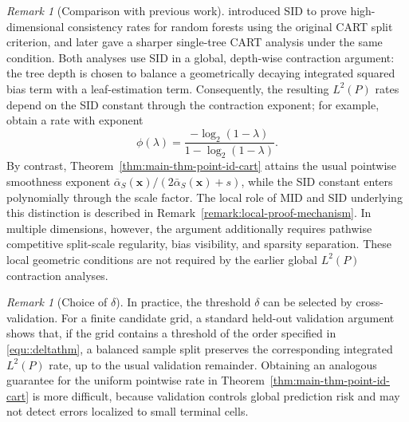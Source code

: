 \documentclass[11pt]{article}
\theoremstyle{plain}
\theoremstyle{definition}
\theoremstyle{remark}
\newtheorem{remark}[theorem]{Remark}
\theoremstyle{plain}
\newcommand{\bx}{\mathbf{x}}
\newcommand{\bX}{\mathbf{X}}
\DeclarePairedDelimiter{\sgnorm}{\|}{\|_{\psi_2}}
\newcommand{\1}{\mathbbm{1}}
\begin{document}
\begin{remark}[Comparison with previous work] \label{rem:comparison-with-previous-work}
\citet{chi2022asymptotic} introduced SID to prove high-dimensional consistency rates for random forests using the original CART split criterion, and \citet{Mazumder2024} later gave a sharper single-tree CART analysis under the same condition.
Both analyses use SID in a global, depth-wise contraction argument: the tree depth is chosen to balance a geometrically decaying integrated squared bias term with a leaf-estimation term.
Consequently, the resulting $L^2(P)$ rates depend on the SID constant through the contraction exponent; for example, \citet{Mazumder2024} obtain a rate with exponent
\[
\phi(\lambda)
=
\frac{-\log_2(1-\lambda)}{1-\log_2(1-\lambda)}.
\]
By contrast, Theorem~\ref{thm:main-thm-point-id-cart} attains the usual pointwise smoothness exponent $\bar\alpha_S(\bx)/(2\bar\alpha_S(\bx)+s)$, while the SID constant enters polynomially through the scale factor. The local role of MID and SID underlying this distinction is described in Remark~\ref{remark:local-proof-mechanism}. In multiple dimensions, however, the argument additionally requires pathwise competitive split-scale regularity, bias visibility, and sparsity separation. These local geometric conditions are not required by the earlier global $L^2(P)$ contraction analyses.
\end{remark}

\begin{remark}[Choice of $\delta$]
    In practice, the threshold $\delta$ can be selected by cross-validation. For a finite candidate grid, a standard held-out validation argument shows that, if the grid contains a threshold of the order specified in \eqref{equ::deltathm}, a balanced sample split preserves the corresponding integrated $L^2(P)$ rate, up to the usual validation remainder. Obtaining an analogous guarantee for the uniform pointwise rate in Theorem~\ref{thm:main-thm-point-id-cart} is more difficult, because validation controls global prediction risk and may not detect errors localized to small terminal cells.\end{remark}

\end{document}
